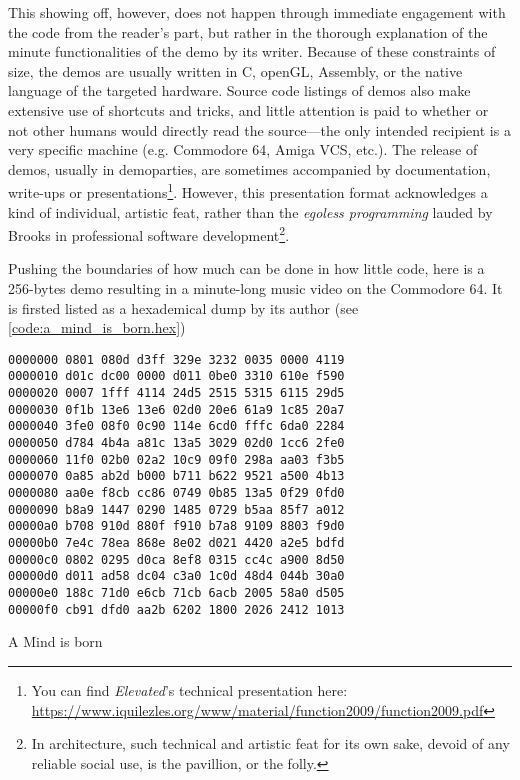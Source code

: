 This showing off, however, does not happen through immediate engagement with the code from the reader's part, but rather in the thorough explanation of the minute functionalities of the demo by its writer. Because of these constraints of size, the demos are usually written in C, openGL, Assembly, or the native language of the targeted hardware. Source code listings of demos also make extensive use of shortcuts and tricks, and little attention is paid to whether or not other humans would directly read the source—the only intended recipient is a very specific machine (e.g. Commodore 64, Amiga VCS, etc.). The release of demos, usually in demoparties, are sometimes accompanied by documentation, write-ups or presentations\footnote{You can find \emph{Elevated}'s technical presentation here: \url{https://www.iquilezles.org/www/material/function2009/function2009.pdf}}. However, this presentation format acknowledges a kind of individual, artistic feat, rather than the \emph{egoless programming} lauded by Brooks in professional software development\footnote{In architecture, such technical and artistic feat for its own sake, devoid of any reliable social use, is the pavillion, or the folly.}.

Pushing the boundaries of how much can be done in how little code, here is a 256-bytes demo resulting in a minute-long music video\cite{akesson_mind_2017} on the Commodore 64. It is firsted listed as a hexademical dump by its author (see \ref{code:a_mind_is_born.hex})

\begin{listing}
  \begin{verbatim}
0000000 0801 080d d3ff 329e 3232 0035 0000 4119
0000010 d01c dc00 0000 d011 0be0 3310 610e f590
0000020 0007 1fff 4114 24d5 2515 5315 6115 29d5
0000030 0f1b 13e6 13e6 02d0 20e6 61a9 1c85 20a7
0000040 3fe0 08f0 0c90 114e 6cd0 fffc 6da0 2284
0000050 d784 4b4a a81c 13a5 3029 02d0 1cc6 2fe0
0000060 11f0 02b0 02a2 10c9 09f0 298a aa03 f3b5
0000070 0a85 ab2d b000 b711 b622 9521 a500 4b13
0000080 aa0e f8cb cc86 0749 0b85 13a5 0f29 0fd0
0000090 b8a9 1447 0290 1485 0729 b5aa 85f7 a012
00000a0 b708 910d 880f f910 b7a8 9109 8803 f9d0
00000b0 7e4c 78ea 868e 8e02 d021 4420 a2e5 bdfd
00000c0 0802 0295 d0ca 8ef8 0315 cc4c a900 8d50
00000d0 d011 ad58 dc04 c3a0 1c0d 48d4 044b 30a0
00000e0 188c 71d0 e6cb 71cb 6acb 2005 58a0 d505
00000f0 cb91 dfd0 aa2b 6202 1800 2026 2412 1013
\end{verbatim}
  \caption{A Mind is born}
  \label{code:a_mind_is_born.hex}
\end{listing}

